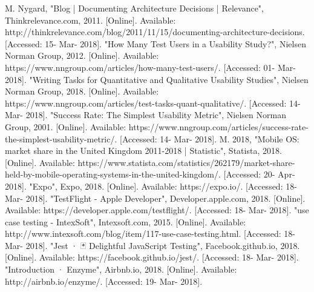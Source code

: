 \documentclass[12pt,a4paper]{article}
\begin{document}
    \begin{thebibliography}{20}
       M. Nygard, "Blog | Documenting Architecture Decisions | Relevance", Thinkrelevance.com, 2011. [Online]. Available: http://thinkrelevance.com/blog/2011/11/15/documenting-architecture-decisions. [Accessed: 15- Mar- 2018].
       "How Many Test Users in a Usability Study?", Nielsen Norman Group, 2012. [Online]. Available: https://www.nngroup.com/articles/how-many-test-users/. [Accessed: 01- Mar- 2018].      
       "Writing Tasks for Quantitative and Qualitative Usability Studies", Nielsen Norman Group, 2018. [Online]. Available: https://www.nngroup.com/articles/test-tasks-quant-qualitative/. [Accessed: 14- Mar- 2018].
       "Success Rate: The Simplest Usability Metric", Nielsen Norman Group, 2001. [Online]. Available: https://www.nngroup.com/articles/success-rate-the-simplest-usability-metric/. [Accessed: 14- Mar- 2018].
       M. 2018, "Mobile OS: market share in the United Kingdom 2011-2018 | Statistic", Statista, 2018. [Online]. Available: https://www.statista.com/statistics/262179/market-share-held-by-mobile-operating-systems-in-the-united-kingdom/. [Accessed: 20- Apr- 2018].
       "Expo", Expo, 2018. [Online]. Available: https://expo.io/. [Accessed: 18- Mar- 2018].
       "TestFlight - Apple Developer", Developer.apple.com, 2018. [Online]. Available: https://developer.apple.com/testflight/. [Accessed: 18- Mar- 2018].
       "use case testing - IntexSoft", Intexsoft.com, 2015. [Online]. Available: http://www.intexsoft.com/blog/item/117-use-case-testing.html. [Accessed: 18- Mar- 2018].
       "Jest · 🃏 Delightful JavaScript Testing", Facebook.github.io, 2018. [Online]. Available: https://facebook.github.io/jest/. [Accessed: 18- Mar- 2018].
       "Introduction · Enzyme", Airbnb.io, 2018. [Online]. Available: http://airbnb.io/enzyme/. [Accessed: 19- Mar- 2018].
    \end{thebibliography}
    
\end{document}
